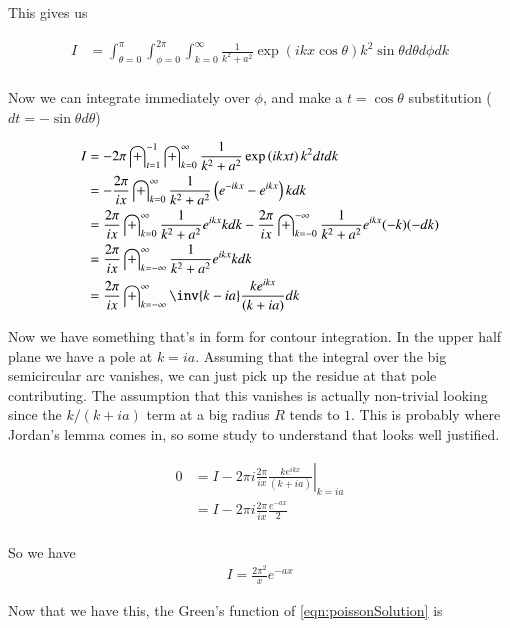 \documentclass{article}
\begin{document}
This gives us 

\begin{align*}
I &= \int_{\theta=0}^{\pi} \int_{\phi=0}^{2\pi} \int_{k=0}^\infty \frac{1}{k^2 + a^2} \exp\left( i k x \cos\theta \right) 
k^2 \sin\theta d\theta d\phi dk \\
\end{align*}

Now we can integrate immediately over $\phi$, and make a $t = \cos\theta$ substitution ($dt = -\sin\theta d\theta$)

\begin{align*}
I 
&= - 2\pi \int_{t=1}^{-1} \int_{k=0}^\infty \frac{1}{k^2 + a^2} \exp\left( i k x t \right) k^2 dt dk \\
&= - \frac{2\pi}{ix} \int_{k=0}^\infty \frac{1}{k^2 + a^2} 
\left( 
e^{-i k x } -e^{i k x } 
\right) 
k dk \\
&= \frac{2\pi}{ix} \int_{k=0}^\infty \frac{1}{k^2 + a^2} 
e^{i k x } 
k dk 
- \frac{2\pi}{ix} \int_{k=-0}^{-\infty} \frac{1}{k^2 + a^2} 
e^{i k x } 
(-k) (-dk) \\
&= \frac{2\pi}{ix} \int_{k=-\infty}^\infty \frac{1}{k^2 + a^2} e^{i k x } k dk \\
&= \frac{2\pi}{ix} \int_{k=-\infty}^\infty \inv{k - ia} \frac{ k e^{ i k x } }{(k + ia)} dk \\
\end{align*}

Now we have something that's in form for contour integration.  In the upper half plane we have a pole at $k= ia$.  Assuming that the
integral over the big semicircular arc vanishes, we can just pick up the residue at that pole contributing.  The assumption that
this vanishes is actually non-trivial looking since the $k/(k+ia)$ term at a big radius $R$ tends to $1$.  This is probably where 
Jordan's lemma comes in, so some study to understand that looks well justified.

\begin{align*}
0 
&= I - 2 \pi i {\left. \frac{2\pi}{ix} \frac{ k e^{ i k x } }{(k + ia)} \right\vert}_{k= ia} \\
&= I - 2 \pi i \frac{2\pi}{ix} \frac{ e^{ - a x } }{2} \\
\end{align*}

So we have
\begin{align*}
I = \frac{2 \pi^2}{x} e^{ - a x } 
\end{align*}

Now that we have this, the Green's function of \ref{eqn:poissonSolution} is
\end{document}
